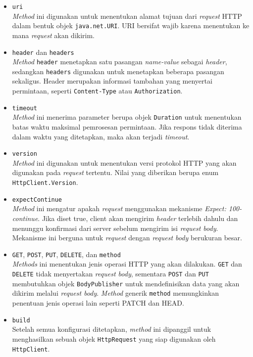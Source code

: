 \begin{itemize}
    \item \texttt{uri}\\
    \textit{Method} ini digunakan untuk menentukan alamat tujuan dari \textit{request} HTTP dalam bentuk objek \texttt{java.net.URI}. URI bersifat wajib karena menentukan ke mana \textit{request} akan dikirim.
    
    \item \texttt{header} dan \texttt{headers}\\
    \textit{Method} \texttt{header} menetapkan satu pasangan \textit{name-value} sebagai \textit{header}, sedangkan \texttt{headers} digunakan untuk menetapkan beberapa pasangan sekaligus. Header merupakan informasi tambahan yang menyertai permintaan, seperti \texttt{Content-Type} atau \texttt{Authorization}.
    
    \item \texttt{timeout}\\
    \textit{Method} ini menerima parameter berupa objek \texttt{Duration} untuk menentukan batas waktu maksimal pemrosesan permintaan. Jika respons tidak diterima dalam waktu yang ditetapkan, maka akan terjadi \textit{timeout}.
    
    \item \texttt{version}\\
    \textit{Method} ini digunakan untuk menentukan versi protokol HTTP yang akan digunakan pada \textit{request} tertentu. Nilai yang diberikan berupa enum \texttt{HttpClient.Version}.
    
    \item \texttt{expectContinue}\\
    \textit{Method} ini mengatur apakah \textit{request} menggunakan mekanisme \textit{Expect: 100-continue}. Jika diset true, client akan mengirim \textit{header} terlebih dahulu dan menunggu konfirmasi dari server sebelum mengirim isi \textit{request body}. Mekanisme ini berguna untuk \textit{request} dengan \textit{request body} berukuran besar.
    
    \item \texttt{GET}, \texttt{POST}, \texttt{PUT}, \texttt{DELETE}, dan \texttt{method}\\
    \textit{Methods} ini menentukan jenis operasi HTTP yang akan dilakukan. \texttt{GET} dan \texttt{DELETE} tidak menyertakan \textit{request body}, sementara \texttt{POST} dan \texttt{PUT} membutuhkan objek \texttt{BodyPublisher} untuk mendefinisikan data yang akan dikirim melalui \textit{request body}. \textit{Method} generik \texttt{method} memungkinkan penentuan jenis operasi lain seperti PATCH dan HEAD.

    
    \item \texttt{build}\\
    Setelah semua konfigurasi ditetapkan, \textit{method} ini dipanggil untuk menghasilkan sebuah objek \texttt{HttpRequest} yang siap digunakan oleh \texttt{HttpClient}.
\end{itemize}



